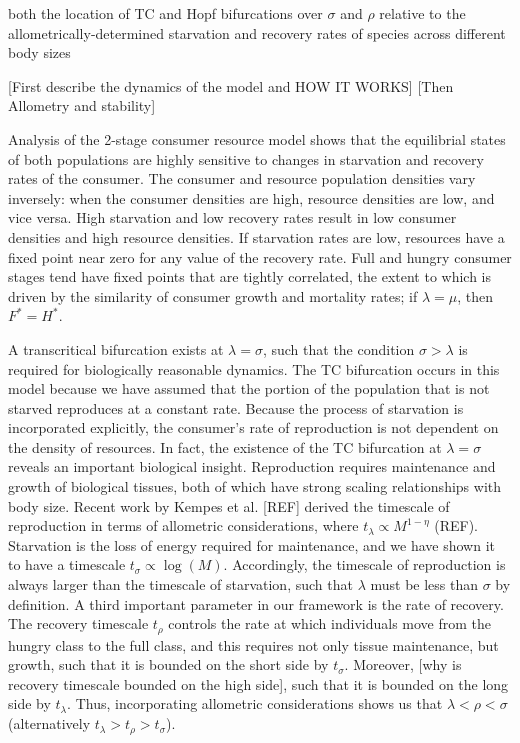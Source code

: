 \documentclass[12pt,english]{article}
\begin{document}
\begin{spacing}{1.9}



both the location of TC and Hopf bifurcations over $\sigma$ and $\rho$ relative to the allometrically-determined starvation and recovery rates of species across different body sizes 

[First describe the dynamics of the model and HOW IT WORKS]
[Then Allometry and stability]

Analysis of the 2-stage consumer resource model shows that the equilibrial states of both populations are highly sensitive to changes in  starvation and recovery rates of the consumer.
The consumer and resource population densities vary inversely: when the consumer densities are high, resource densities are low, and vice versa.
High starvation and low recovery rates result in low consumer densities and high resource densities. %
If starvation rates are low, resources have a fixed point near zero for any value of the recovery rate.
Full and hungry consumer stages tend have fixed points that are tightly correlated, the extent to which is driven by the similarity of consumer growth and mortality rates; if $\lambda = \mu$, then $F^* = H^*$.

A transcritical bifurcation exists at $\lambda = \sigma$, such that the condition $\sigma > \lambda$ is required for biologically reasonable dynamics.
The TC bifurcation occurs in this model because we have assumed that the portion of the population that is not starved reproduces at a constant rate.
Because the process of starvation is incorporated explicitly, the consumer's rate of reproduction is not dependent on the density of resources.
In fact, the existence of the TC bifurcation at $\lambda = \sigma$ reveals an important biological insight. 
Reproduction requires maintenance and growth of biological tissues, both of which have strong scaling relationships with body size.
Recent work by Kempes et al. [REF] derived the timescale of reproduction in terms of allometric considerations, where $t_\lambda \propto M^{1-\eta}$ (REF).
Starvation is the loss of energy required for maintenance, and we have shown it to have a timescale $t_\sigma \propto \log(M)$.
Accordingly, the timescale of reproduction is always larger than the timescale of starvation, such that $\lambda$ must be less than $\sigma$ by definition.
A third important parameter in our framework is the rate of recovery.
The recovery timescale $t_\rho$ controls the rate at which individuals move from the hungry class to the full class, and this requires not only tissue maintenance, but growth, such that it is bounded on the short side by $t_\sigma$.
Moreover, [why is recovery timescale bounded on the high side], such that it is bounded on the long side by $t_\lambda$.
Thus, incorporating allometric considerations shows us that $\lambda < \rho < \sigma$ (alternatively $t_\lambda > t_\rho > t_\sigma$).


\end{spacing}
\end{document}
